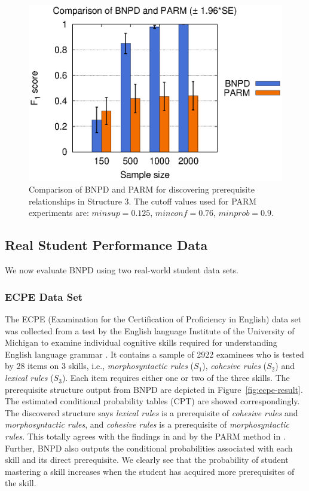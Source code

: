 \documentclass{edm_template}
\begin{document}
{	
		\begin{figure}[!th]
			\begin{center}
				\centering
					\includegraphics[width=0.7\linewidth]{figures/F1_parm.eps}
			\end{center}
			\caption{Comparison of BNPD and PARM for discovering prerequisite relationships in Structure 3. The cutoff values used for PARM experiments are: $ minsup=0.125$, $minconf=0.76$, $minprob=0.9$.}
			\label{fig:f1-parm} 
		\end{figure}	 
	
	\subsection{Real Student Performance Data}
	\label{sec:real}
	We now evaluate BNPD using two real-world student data sets.
	
	\subsubsection{ECPE Data Set}
	The ECPE (Examination for the Certification of Proficiency in English) data set was collected from a test by the English language Institute
	of the University of Michigan to examine individual cognitive skills required for understanding English language grammar \cite{templin2014hierarchical}.
	It contains a sample of 2922 examinees who is tested by 28 items on 3 skills, i.e., \emph{morphosyntactic rules} ($S_1$), \emph{cohesive rules} ($S_2$) 
	and \emph{lexical rules} ($S_3$). Each item requires either one or two of the three skills. 
	The prerequisite structure output from BNPD are depicted in Figure~\ref{fig:ecpe-result}. The estimated conditional probability tables (CPT) are showed correspondingly.
	The discovered structure says \emph{lexical rules} is a prerequisite of \emph{cohesive rules} and \emph{morphosyntactic rules}, 
	and \emph{cohesive rules} is a prerequisite of \emph{morphosyntactic rules}. 
	This totally agrees with the findings in \cite{templin2014hierarchical} and by the PARM method in \cite{chen2015discovering}.
	Further, BNPD also outputs the conditional probabilities associated with each skill and its direct prerequisite.
	We clearly see that the probability of student mastering a skill increases when the student has acquired more prerequisites of the skill.
	
}
\end{document}

